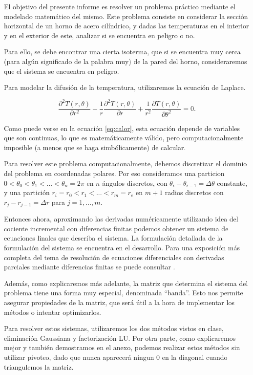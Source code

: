 
El objetivo del presente informe es resolver un problema práctico mediante el modelado matemático del mismo. Este problema consiste en considerar la sección horizontal de un horno de acero cilíndrico, y dadas las temperaturas en el interior y en el exterior de este, analizar si se encuentra en peligro o no.

Para ello, se debe encontrar una cierta isoterma, que si se encuentra muy cerca (para algún significado de la palabra muy) de la pared del horno, consideraremos que el sistema se encuentra en peligro.

Para modelar la difusión de la temperatura, utilizaremos la ecuación de Laplace.

\begin{equation}\label{eq:calor}
\frac{\partial^2T(r,\theta)}{\partial r^{2}}+\frac1r \frac{\partial^2 T(r,\theta)}{\partial r} + \frac{1}{r^2} \frac{\partial T(r, \theta)}{\partial \theta^2} = 0.
\end{equation}

Como puede verse en la ecuación \ref{eq:calor}, esta ecuación depende de variables que son continuas, lo que es matemáticamente válido, pero computacionalmente imposible (a menos que se haga simbólicamente) de calcular.

Para resolver este problema computacionalmente, debemos discretizar el dominio del problema en coordenadas polares. Por eso consideramos una particion $0 < \theta_0 < \theta_1 < ... < \theta_n = 2\pi$ en $n$ ángulos discretos, con $\theta_i - \theta_{i-1} = \Delta\theta$ constante, y una partición $r_i = r_0 < r_1 < ... < r_m = r_e$ en $m+1$ radios discretos con $r_j - r_{j-1} = \Delta r$ para $j = 1,...,m$.

Entonces ahora, aproximando las derivadas numéricamente utilizando idea del cociente incremental con diferencias finitas podemos obtener un sistema de ecuaciones linales que describa el sistema. La formulación detallada de la formulación del sistema se encuentra en el desarrollo. Para una exposición más completa del tema de resolución de ecuaciones diferenciales con derivadas parciales mediante diferencias finitas se puede consultar \cite[Cap. 11]{burden}.

Además, como explicaremos más adelante, la matriz que determina el sistema del problema tiene una forma muy especial, denominada ``banda''. Esto nos permite asegurar propiedades de la matriz, que será útil a la hora de implementar los métodos o intentar optimizarlos.

Para resolver estos sistemas, utilizaremos los dos métodos vistos en clase, eliminación Gaussiana y factorización LU. Por otra parte, como explicaremos mejor y también demostramos en el anexo, podemos realizar estos métodos sin utilizar pivoteo, dado que nunca aparecerá ningun $0$ en la diagonal cuando triangulemos la matriz.


